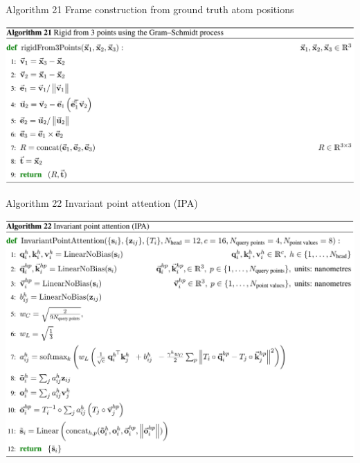 \documentclass[presentation, smaller]{beamer}
\begin{document}
\begin{frame}[label={sec:orgb0270ae}]{Algorithm 21 Frame construction from ground truth atom positions \cite{jumperHighlyAccurateProtein2021}}
\begin{center}
\includegraphics[height=0.9\textheight]{./imgs/algo21_gram_schmidt.png}
\end{center}
\end{frame}
\begin{frame}[label={sec:org5332876}]{Algorithm 22 Invariant point attention (IPA) \cite{jumperHighlyAccurateProtein2021}}
\begin{center}
\includegraphics[height=0.9\textheight]{./imgs/algo22_ipa.png}
\end{center}
\end{frame}
\end{document}
